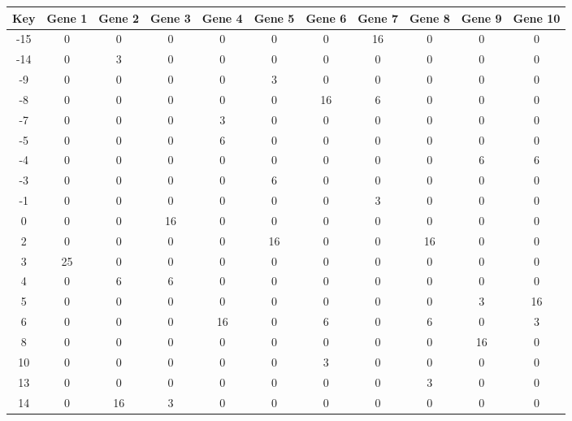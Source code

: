 \begin{tabular}{|c|c|c|c|c|c|c|c|c|c|c|}
\hline
Key & Gene 1 & Gene 2 & Gene 3 & Gene 4 & Gene 5 & Gene 6 & Gene 7 & Gene 8 & Gene 9 & Gene 10 \\
\hline
-15 & 0 & 0 & 0 & 0 & 0 & 0 & 16 & 0 & 0 & 0 \\
-14 & 0 & 3 & 0 & 0 & 0 & 0 & 0 & 0 & 0 & 0 \\
-9 & 0 & 0 & 0 & 0 & 3 & 0 & 0 & 0 & 0 & 0 \\
-8 & 0 & 0 & 0 & 0 & 0 & 16 & 6 & 0 & 0 & 0 \\
-7 & 0 & 0 & 0 & 3 & 0 & 0 & 0 & 0 & 0 & 0 \\
-5 & 0 & 0 & 0 & 6 & 0 & 0 & 0 & 0 & 0 & 0 \\
-4 & 0 & 0 & 0 & 0 & 0 & 0 & 0 & 0 & 6 & 6 \\
-3 & 0 & 0 & 0 & 0 & 6 & 0 & 0 & 0 & 0 & 0 \\
-1 & 0 & 0 & 0 & 0 & 0 & 0 & 3 & 0 & 0 & 0 \\
0 & 0 & 0 & 16 & 0 & 0 & 0 & 0 & 0 & 0 & 0 \\
2 & 0 & 0 & 0 & 0 & 16 & 0 & 0 & 16 & 0 & 0 \\
3 & 25 & 0 & 0 & 0 & 0 & 0 & 0 & 0 & 0 & 0 \\
4 & 0 & 6 & 6 & 0 & 0 & 0 & 0 & 0 & 0 & 0 \\
5 & 0 & 0 & 0 & 0 & 0 & 0 & 0 & 0 & 3 & 16 \\
6 & 0 & 0 & 0 & 16 & 0 & 6 & 0 & 6 & 0 & 3 \\
8 & 0 & 0 & 0 & 0 & 0 & 0 & 0 & 0 & 16 & 0 \\
10 & 0 & 0 & 0 & 0 & 0 & 3 & 0 & 0 & 0 & 0 \\
13 & 0 & 0 & 0 & 0 & 0 & 0 & 0 & 3 & 0 & 0 \\
14 & 0 & 16 & 3 & 0 & 0 & 0 & 0 & 0 & 0 & 0 \\
\hline
\end{tabular}